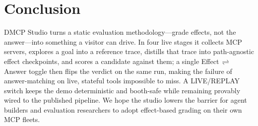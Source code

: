 \section{Conclusion}
\label{sec:conclusion}

DMCP Studio turns a static evaluation methodology---grade effects, not the
answer---into something a visitor can drive. In four live stages it
collects MCP servers, explores a goal into a reference trace, distills that
trace into path-agnostic effect checkpoints, and scores a candidate against
them; a single Effect\,$\rightleftharpoons$\,Answer toggle then flips the
verdict on the same run, making the failure of answer-matching on live,
stateful tools impossible to miss. A LIVE/REPLAY switch keeps the demo
deterministic and booth-safe while remaining provably wired to the published
pipeline. We hope the studio lowers the barrier for agent builders and
evaluation researchers to adopt effect-based grading on their own MCP
fleets.
